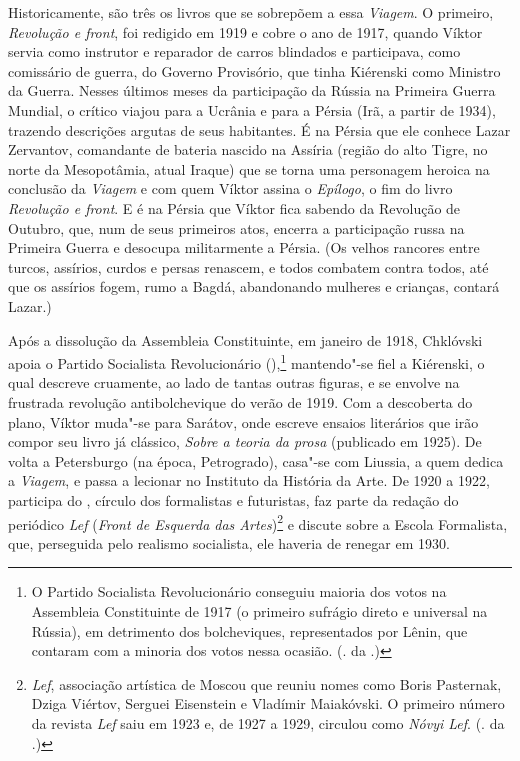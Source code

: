 Historicamente, são três os livros que se sobrepõem a essa
\emph{Viagem}. O primeiro, \emph{Revolução e front}, foi
redigido em 1919 e cobre o ano de 1917, quando Víktor servia
como instrutor e reparador de carros blindados e participava,
como comissário de guerra, do Governo Provisório, que tinha
Kiérenski como Ministro da Guerra. Nesses últimos meses da
participação da Rússia na Primeira Guerra Mundial, o crítico
viajou para a Ucrânia e para a Pérsia (Irã, a partir de 1934),
trazendo descrições argutas de seus habitantes. É na Pérsia que
ele conhece Lazar Zervantov, comandante de bateria nascido na
Assíria (região do alto Tigre, no norte da Mesopotâmia, atual
Iraque) que se torna uma personagem heroica na conclusão da
\emph{Viagem} e com quem Víktor assina o \emph{Epílogo}, o fim
do livro \emph{Revolução e front}. E é na Pérsia que Víktor fica
sabendo da Revolução de Outubro, que, num de seus primeiros atos,
encerra a participação russa na Primeira Guerra e desocupa
militarmente a Pérsia. (Os velhos rancores entre turcos, assírios,
curdos e persas renascem, e todos combatem contra todos, até
que os assírios fogem, rumo a Bagdá, abandonando mulheres e
crianças, contará Lazar.)

Após a dissolução da Assembleia Constituinte, em janeiro de 1918,
Chklóvski apoia o Partido Socialista Revolucionário (),\footnote{O Partido Socialista Revolucionário conseguiu maioria dos votos na Assembleia Constituinte de 1917 (o primeiro sufrágio direto e universal na Rússia), em detrimento dos bolcheviques, representados por Lênin, que contaram com a minoria dos votos nessa ocasião. (. da .)}
mantendo"-se fiel a Kiérenski, o qual descreve cruamente, ao lado
de tantas outras figuras, e se envolve na frustrada revolução
antibolchevique do verão de 1919. Com a descoberta do plano,
Víktor muda"-se para Sarátov, onde escreve ensaios literários
que irão compor seu livro já clássico, \emph{Sobre a teoria da
prosa} (publicado em 1925). De volta a Petersburgo (na época,
Petrogrado), casa"-se com Liussia, a quem dedica a \emph{Viagem},
e passa a lecionar no Instituto da História da Arte. De
1920 a 1922, participa do , círculo dos formalistas
e futuristas, faz parte da redação do periódico \emph{Lef}
(\emph{Front de Esquerda das Artes})\footnote{\emph{Lef}, associação artística de
Moscou que reuniu nomes como Boris Pasternak, Dziga Viértov,
Serguei Eisenstein e Vladímir Maiakóvski. O primeiro número da
revista \emph{Lef} saiu em 1923 e, de 1927 a 1929, circulou como
\emph{Nóvyi Lef}. (. da .)} e discute sobre a Escola
Formalista, que, perseguida pelo realismo socialista, ele haveria
de renegar em 1930.

